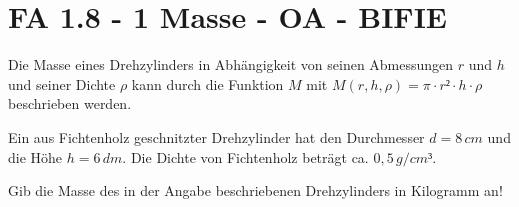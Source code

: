 \section{FA 1.8 - 1 Masse - OA - BIFIE}

\begin{beispiel}[FA 1.8]{1} %
Die Masse eines Drehzylinders in Abhängigkeit von seinen Abmessungen $r$ und $h$ und seiner Dichte $\rho$ kann durch die Funktion $M$ mit $M(r,h,\rho)=\pi \cdot r²\cdot h\cdot \rho$ beschrieben werden.

Ein aus Fichtenholz geschnitzter Drehzylinder hat den Durchmesser $d=8\,cm$ und die Höhe $h=6\,dm$. Die Dichte von Fichtenholz beträgt ca. $0,5\,g/cm³$.

Gib die Masse des in der Angabe beschriebenen Drehzylinders in Kilogramm an!
\leer

\end{beispiel}